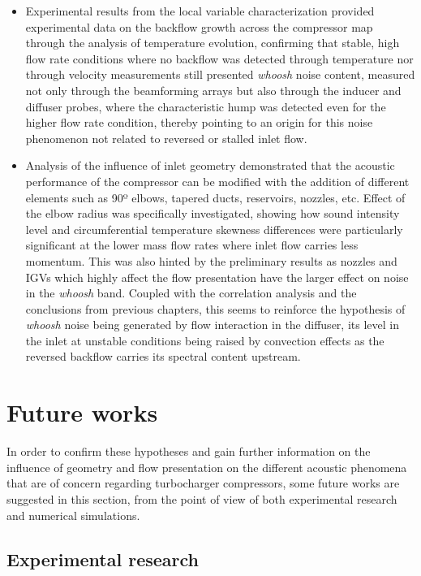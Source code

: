 \begin{itemize}
	\item Experimental results from the local variable characterization provided experimental data on the backflow growth across the compressor map through the analysis of temperature evolution, confirming that stable, high flow rate conditions where no backflow was detected through temperature nor through velocity measurements still presented \emph{whoosh} noise content, measured not only through the beamforming arrays but also through the inducer and diffuser probes, where the characteristic hump was detected even for the higher flow rate condition, thereby pointing to an origin for this noise phenomenon not related to reversed or stalled inlet flow.

	\item Analysis of the influence of inlet geometry demonstrated that the acoustic performance of the compressor can be modified with the addition of different elements such as 90º elbows, tapered ducts, reservoirs, nozzles, etc. Effect of the elbow radius was specifically investigated, showing how sound intensity level and circumferential temperature skewness differences were particularly significant at the lower mass flow rates where inlet flow carries less momentum. This was also hinted by the preliminary results as nozzles and IGVs which highly affect the flow presentation have the larger effect on noise in the \emph{whoosh} band. Coupled with the correlation analysis and the conclusions from previous chapters, this seems to reinforce the hypothesis of \emph{whoosh} noise being generated by flow interaction in the diffuser, its level in the inlet at unstable conditions being raised by convection effects as the reversed backflow carries its spectral content upstream.
\end{itemize}

\section{Future works}

In order to confirm these hypotheses and gain further information on the influence of geometry and flow presentation on the different acoustic phenomena that are of concern regarding turbocharger compressors, some future works are suggested in this section, from the point of view of both experimental research and numerical simulations.

\subsection{Experimental research}


